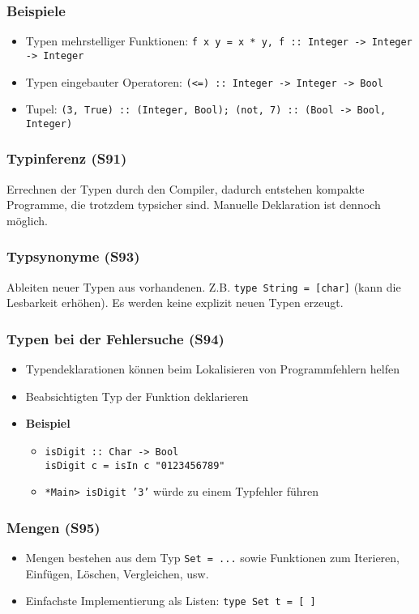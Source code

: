 \subsubsection{Beispiele}
\begin{itemize}
	\item Typen mehrstelliger Funktionen: \texttt{f x y = x * y, f :: Integer -> Integer -> Integer}
	\item Typen eingebauter Operatoren: \texttt{(<=) :: Integer -> Integer -> Bool}
	\item Tupel: \texttt{(3, True) :: (Integer, Bool); (not, 7) :: (Bool -> Bool, Integer)}
\end{itemize}

\subsubsection{Typinferenz (S91)}
Errechnen der Typen durch den Compiler, dadurch entstehen kompakte Programme, die trotzdem typsicher sind. Manuelle Deklaration ist dennoch möglich.

\subsubsection{Typsynonyme (S93)}
Ableiten neuer Typen aus vorhandenen. Z.B. \texttt{type String = {[}char{]}} (kann die Lesbarkeit erhöhen). Es werden keine explizit neuen Typen erzeugt.

\subsubsection{Typen bei der Fehlersuche (S94)}
\begin{itemize}
	\item Typendeklarationen können beim Lokalisieren von Programmfehlern helfen
	\item Beabsichtigten Typ der Funktion deklarieren
	\item \textbf{Beispiel}
	\begin{itemize}
		\item \texttt{isDigit :: Char -> Bool}\\\texttt{isDigit c = isIn c "0123456789"}
		\item \texttt{*Main> isDigit '3'} würde zu einem Typfehler führen
	\end{itemize}
\end{itemize}

\subsubsection{Mengen (S95)}
\begin{itemize}
	\item Mengen bestehen aus dem Typ \texttt{Set = ...} sowie Funktionen zum Iterieren, Einfügen, Löschen, Vergleichen, usw.
	\item Einfachste Implementierung als Listen: \texttt{type Set t = {[} {]}}
\end{itemize}



